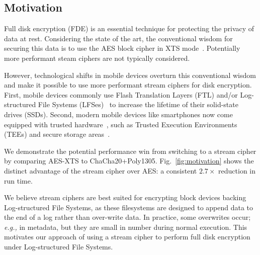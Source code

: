 \documentclass[a0,portrait]{a0poster}
\newcommand{\eg}{\textit{e.g., }}
\newcommand{\figref}[1]{Fig.~\ref{fig:#1}}
\begin{document}
\begin{multicols}{2}
\begin{abstract}
\end{abstract}


\color{SaddleBrown} %

\section*{Motivation}

Full disk encryption (FDE) is an essential technique for protecting the privacy
of data at rest. Considering the state of the art, the conventional wisdom for
securing this data is to use the AES block cipher in XTS mode~\cite{NISTXTS}.
Potentially more performant steam ciphers are not typically considered.

However, technological shifts in mobile devices overturn this conventional
wisdom and make it possible to use more performant stream ciphers for disk
encryption. First, mobile devices commonly use Flash Translation Layers (FTL)
and/or Log-structured File Systems (LFSes)~\cite{LFS,F2FS,NILFS} to increase the
lifetime of their solid-state drives (SSDs). Second, modern mobile devices like
smartphones now come equipped with trusted hardware~\cite{TEE,TrustZone}, such
as Trusted Execution Environments (TEEs) and secure storage
areas~\cite{eMMC-standard}.

We demonstrate the potential performance win from switching to a stream cipher
by comparing AES-XTS to ChaCha20+Poly1305. \figref{motivation} shows the
distinct advantage of the stream cipher over AES: a consistent $2.7\times$
reduction in run time.

We believe stream ciphers are best suited for encrypting block devices backing
Log-structured File Systems, as these filesystems are designed to append data to
the end of a log rather than over-write data. In practice, some overwrites
occur; \eg{in metadata}, but they are small in number during normal execution.
This motivates our approach of using a stream cipher to perform full disk
encryption under Log-structured File Systems.

\vspace{0.5cm}


\end{multicols}
\end{document}

